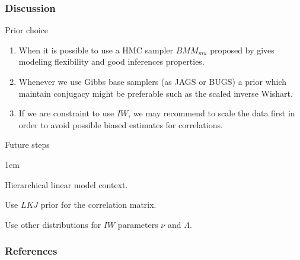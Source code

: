 \documentclass[9pt]{beamer}\usepackage[]{graphicx}\usepackage[]{color}
\begin{document}
\begin{frame}
\frametitle{Discussion}
Prior choice
\begin{enumerate} \itemsep1em
\item When it is possible to use a HMC sampler $BMM_{mu}$ proposed by \cite{barnard2000} gives modeling flexibility and good inferences properties. 
\item Whenever we use Gibbs base samplers (as JAGS or BUGS) a prior which maintain conjugacy might be preferable such as the scaled inverse Wishart. 
\item If we are constraint to use $IW$, we may recommend to scale the data first in order to avoid possible biased estimates for correlations.  
\end{enumerate}  
\pause

Future steps
\begin{description} \itemsep1em
\item[Different Model] Hierarchical linear model context. 

\item[Different Priors] Use $LKJ$ prior for the correlation matrix. 

Use other distributions for $IW$ parameters $\nu$ and $\Lambda$.
\end{description}
\end{frame}






\begin{frame}
\frametitle{References}
        
\small{   }
\end{frame}
\end{document}
